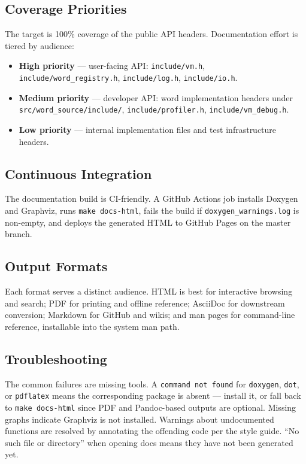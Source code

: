 \subsection{Coverage Priorities}

The target is 100\% coverage of the public API headers. Documentation effort is
tiered by audience:

\begin{itemize}
  \item \textbf{High priority} --- user-facing API: \texttt{include/vm.h},
    \texttt{include/word\_registry.h}, \texttt{include/log.h},
    \texttt{include/io.h}.
  \item \textbf{Medium priority} --- developer API: word implementation headers
    under \texttt{src/word\_source/include/}, \texttt{include/profiler.h},
    \texttt{include/vm\_debug.h}.
  \item \textbf{Low priority} --- internal implementation files and test
    infrastructure headers.
\end{itemize}


\subsection{Continuous Integration}

The documentation build is CI-friendly. A GitHub Actions job installs Doxygen
and Graphviz, runs \texttt{make docs-html}, fails the build if
\texttt{doxygen\_warnings.log} is non-empty, and deploys the generated HTML to
GitHub Pages on the master branch.

\subsection{Output Formats}

Each format serves a distinct audience. HTML is best for interactive browsing
and search; PDF for printing and offline reference; AsciiDoc for downstream
conversion; Markdown for GitHub and wikis; and man pages for command-line
reference, installable into the system man path.

\subsection{Troubleshooting}

The common failures are missing tools. A \texttt{command not found} for
\texttt{doxygen}, \texttt{dot}, or \texttt{pdflatex} means the corresponding
package is absent --- install it, or fall back to \texttt{make docs-html} since
PDF and Pandoc-based outputs are optional. Missing graphs indicate Graphviz is
not installed. Warnings about undocumented functions are resolved by annotating
the offending code per the style guide. ``No such file or directory'' when
opening docs means they have not been generated yet.

